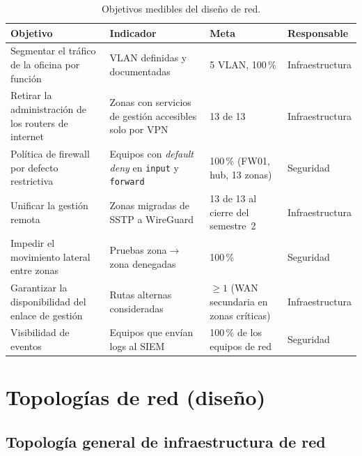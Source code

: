 \begin{table}[H]
\centering
\caption{Objetivos medibles del diseño de red.}
\label{tab:ce03-objetivos-red}
\small
\begin{tabularx}{\textwidth}{XL{3.6cm}L{2cm}L{2.4cm}}
\toprule
\textbf{Objetivo} & \textbf{Indicador} & \textbf{Meta} & \textbf{Responsable} \\
\midrule
Segmentar el tráfico de la oficina por función & VLAN definidas y documentadas & 5 VLAN, 100\,\% & Infraestructura \\
Retirar la administración de los routers de internet & Zonas con servicios de gestión accesibles solo por VPN & 13 de 13 & Infraestructura \\
Política de firewall por defecto restrictiva & Equipos con \emph{default deny} en \texttt{input} y \texttt{forward} & 100\,\% (FW01, hub, 13 zonas) & Seguridad \\
Unificar la gestión remota & Zonas migradas de SSTP a WireGuard & 13 de 13 al cierre del semestre~2 & Infraestructura \\
Impedir el movimiento lateral entre zonas & Pruebas zona$\rightarrow$zona denegadas & 100\,\% & Seguridad \\
Garantizar la disponibilidad del enlace de gestión & Rutas alternas consideradas & $\geq 1$ (WAN secundaria en zonas críticas) & Infraestructura \\
Visibilidad de eventos & Equipos que envían logs al SIEM & 100\,\% de los equipos de red & Seguridad \\
\bottomrule
\end{tabularx}
\end{table}

\section{Topologías de red (diseño)}
\label{sec:ce03-topologias}

\subsection{Topología general de infraestructura de red}

